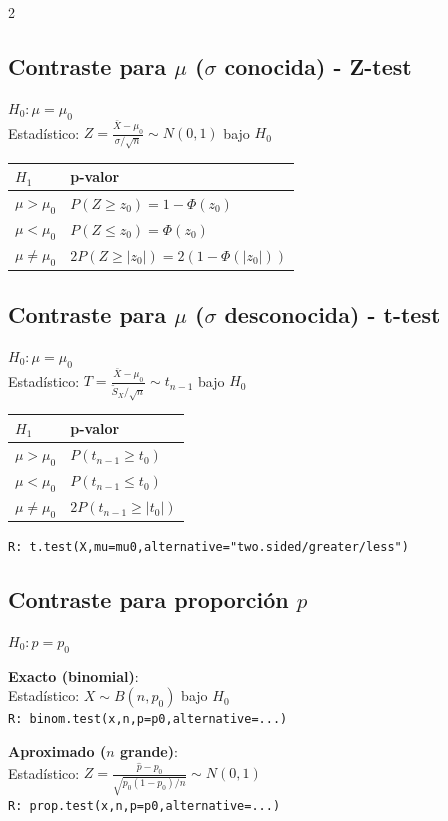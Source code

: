 \documentclass[9pt,a4paper]{article}
\newcommand{\R}{\texttt{R: }}
\begin{document}
\begin{multicols}{2}
\subsection{Contraste para $\mu$ ($\sigma$ conocida) - Z-test}
$H_0:\mu=\mu_0$\\
Estadístico: $Z=\frac{\bar{X}-\mu_0}{\sigma/\sqrt{n}}\sim N(0,1)$ bajo $H_0$

\begin{center}
\begin{tabular}{@{}l|l@{}}
$H_1$ & p-valor\\
\hline
$\mu>\mu_0$ & $P(Z\geq z_0)=1-\Phi(z_0)$\\
$\mu<\mu_0$ & $P(Z\leq z_0)=\Phi(z_0)$\\
$\mu\neq\mu_0$ & $2P(Z\geq|z_0|)=2(1-\Phi(|z_0|))$
\end{tabular}
\end{center}

\subsection{Contraste para $\mu$ ($\sigma$ desconocida) - t-test}
$H_0:\mu=\mu_0$\\
Estadístico: $T=\frac{\bar{X}-\mu_0}{\tilde{S}_X/\sqrt{n}}\sim t_{n-1}$ bajo $H_0$

\begin{center}
\begin{tabular}{@{}l|l@{}}
$H_1$ & p-valor\\
\hline
$\mu>\mu_0$ & $P(t_{n-1}\geq t_0)$\\
$\mu<\mu_0$ & $P(t_{n-1}\leq t_0)$\\
$\mu\neq\mu_0$ & $2P(t_{n-1}\geq|t_0|)$
\end{tabular}
\end{center}

\R\texttt{t.test(X,mu=mu0,alternative="two.sided/greater/less")}

\subsection{Contraste para proporción $p$}
$H_0:p=p_0$

\textbf{Exacto (binomial)}:\\
Estadístico: $X\sim B(n,p_0)$ bajo $H_0$\\
\R\texttt{binom.test(x,n,p=p0,alternative=...)}

\textbf{Aproximado ($n$ grande)}:\\
Estadístico: $Z=\frac{\hat{p}-p_0}{\sqrt{p_0(1-p_0)/n}}\sim N(0,1)$\\
\R\texttt{prop.test(x,n,p=p0,alternative=...)}


\end{multicols}
\end{document}
